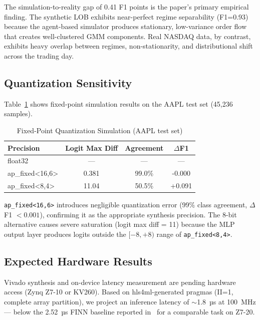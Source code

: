 \documentclass[conference]{IEEEtran}
\begin{document}
The simulation-to-reality gap of 0.41 F1 points is the paper's primary empirical
finding. The synthetic LOB exhibits near-perfect regime separability (F1=0.93)
because the agent-based simulator produces stationary, low-variance order flow
that creates well-clustered GMM components. Real NASDAQ data, by contrast,
exhibits heavy overlap between regimes, non-stationarity, and distributional
shift across the trading day.

\subsection{Quantization Sensitivity}
Table~\ref{tab:quant} shows fixed-point simulation results on the AAPL test set
(45,236 samples).

\begin{table}[h]
  \centering
  \caption{Fixed-Point Quantization Simulation (AAPL test set)}
  \label{tab:quant}
  \begin{tabular}{lccc}
    \toprule
    Precision & Logit Max Diff & Agreement & $\Delta$F1 \\
    \midrule
    float32          & ---   & ---    & ---    \\
    ap\_fixed<16,6>  & 0.381 & 99.0\% & -0.000 \\
    ap\_fixed<8,4>   & 11.04 & 50.5\% & +0.091 \\
    \bottomrule
  \end{tabular}
\end{table}

\texttt{ap\_fixed<16,6>} introduces negligible quantization error (99\% class
agreement, $\Delta$F1 $< 0.001$), confirming it as the appropriate synthesis
precision. The 8-bit alternative causes severe saturation (logit max diff = 11)
because the MLP output layer produces logits outside the $[-8,+8)$ range of
\texttt{ap\_fixed<8,4>}.

\subsection{Expected Hardware Results}
Vivado synthesis and on-device latency measurement are pending hardware
access (Zynq Z7-10 or KV260). Based on hls4ml-generated pragmas
(II=1, complete array partition), we project an inference latency of
$\sim$1.8~µs at 100~MHz — below the 2.52~µs FINN baseline reported
in~\cite{umuroglu2017finn} for a comparable task on Z7-20.
\end{document}
